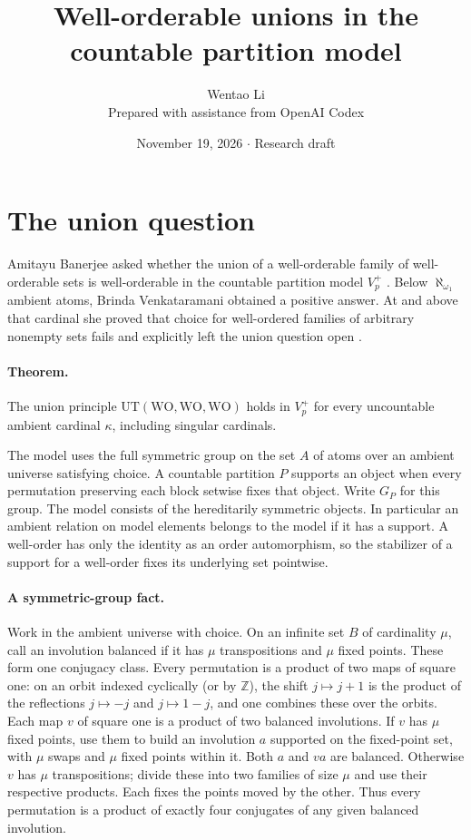 \documentclass[11pt]{article}
\title{Well-orderable unions in the countable partition model}
\author{Wentao Li\\{\small Prepared with assistance from OpenAI Codex}}
\date{November 19, 2026 \quad $\cdot$ \quad Research draft}
\begin{document}
\maketitle
\section*{The union question}
Amitayu Banerjee asked whether the union of a well-orderable family of well-orderable sets is well-orderable in the countable partition model $V_p^+$ \cite{ban}. Below $\aleph_{\omega_1}$ ambient atoms, Brinda Venkataramani obtained a positive answer. At and above that cardinal she proved that choice for well-ordered families of arbitrary nonempty sets fails and explicitly left the union question open \cite{ven}.

\paragraph{Theorem.} The union principle $\mathrm{UT}(\mathrm{WO},\mathrm{WO},\mathrm{WO})$ holds in $V_p^+$ for every uncountable ambient cardinal $\kappa$, including singular cardinals.

The model uses the full symmetric group on the set $A$ of atoms over an ambient universe satisfying choice. A countable partition $P$ supports an object when every permutation preserving each block setwise fixes that object. Write $G_P$ for this group. The model consists of the hereditarily symmetric objects. In particular an ambient relation on model elements belongs to the model if it has a support. A well-order has only the identity as an order automorphism, so the stabilizer of a support for a well-order fixes its underlying set pointwise.
\paragraph{A symmetric-group fact.} Work in the ambient universe with choice. On an infinite set $B$ of cardinality $\mu$, call an involution balanced if it has $\mu$ transpositions and $\mu$ fixed points. These form one conjugacy class. Every permutation is a product of two maps of square one: on an orbit indexed cyclically (or by $\mathbb Z$), the shift $j\mapsto j+1$ is the product of the reflections $j\mapsto-j$ and $j\mapsto1-j$, and one combines these over the orbits. Each map $v$ of square one is a product of two balanced involutions. If $v$ has $\mu$ fixed points, use them to build an involution $a$ supported on the fixed-point set, with $\mu$ swaps and $\mu$ fixed points within it. Both $a$ and $va$ are balanced. Otherwise $v$ has $\mu$ transpositions; divide these into two families of size $\mu$ and use their respective products. Each fixes the points moved by the other. Thus every permutation is a product of exactly four conjugates of any given balanced involution.
\end{document}

